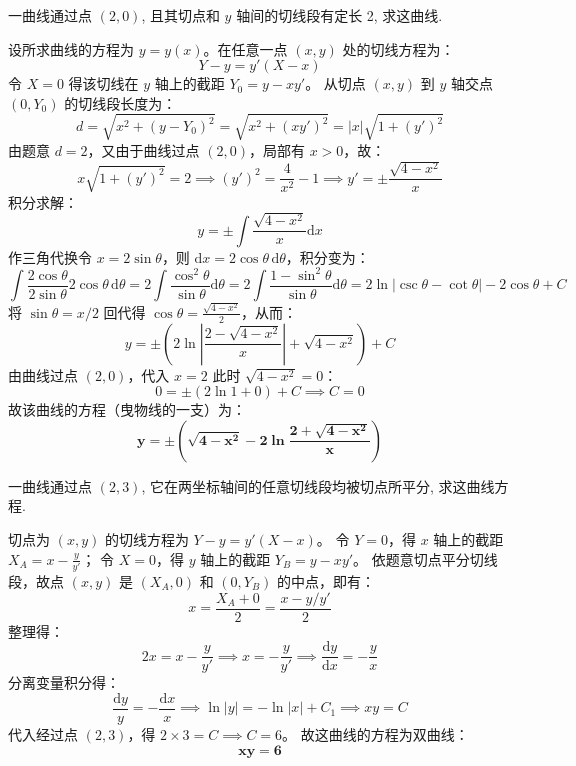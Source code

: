 \documentclass[lang=cn,11pt]{elegantbook}
\begin{document}
\begin{exercise}[求解曲线]
一曲线通过点 $(2,0)$, 且其切点和 $y$ 轴间的切线段有定长 2, 求这曲线.
\end{exercise}
\begin{solution}
设所求曲线的方程为 $y=y(x)$。在任意一点 $(x,y)$ 处的切线方程为：
\[
Y-y = y'(X-x)
\]
令 $X=0$ 得该切线在 $y$ 轴上的截距 $Y_0 = y - xy'$。
从切点 $(x,y)$ 到 $y$ 轴交点 $(0, Y_0)$ 的切线段长度为：
\[
d = \sqrt{x^2 + (y-Y_0)^2} = \sqrt{x^2 + (xy')^2} = |x|\sqrt{1+(y')^2}
\]
由题意 $d=2$，又由于曲线过点 $(2,0)$，局部有 $x>0$，故：
\[
x\sqrt{1+(y')^2} = 2 \implies (y')^2 = \frac{4}{x^2}-1 \implies y' = \pm\frac{\sqrt{4-x^2}}{x}
\]
积分求解：
\[
y = \pm\int \frac{\sqrt{4-x^2}}{x}\mathrm{d}x
\]
作三角代换令 $x = 2\sin\theta$，则 $\mathrm{d}x = 2\cos\theta\,\mathrm{d}\theta$，积分变为：
\[
\int \frac{2\cos\theta}{2\sin\theta} 2\cos\theta\,\mathrm{d}\theta = 2\int \frac{\cos^2\theta}{\sin\theta}\mathrm{d}\theta = 2\int \frac{1-\sin^2\theta}{\sin\theta}\mathrm{d}\theta = 2\ln|\csc\theta - \cot\theta| - 2\cos\theta + C
\]
将 $\sin\theta = x/2$ 回代得 $\cos\theta = \frac{\sqrt{4-x^2}}{2}$，从而：
\[
y = \pm \left( 2\ln\left|\frac{2-\sqrt{4-x^2}}{x}\right| + \sqrt{4-x^2} \right) + C
\]
由曲线过点 $(2,0)$，代入 $x=2$ 此时 $\sqrt{4-x^2}=0$：
\[
0 = \pm (2\ln 1 + 0) + C \implies C=0
\]
故该曲线的方程（曳物线的一支）为：
\[
\mathbf{y = \pm \left( \sqrt{4-x^2} - 2\ln\frac{2+\sqrt{4-x^2}}{x} \right)}
\]
\end{solution}

\begin{exercise}[求解曲线]
一曲线通过点 $(2,3)$, 它在两坐标轴间的任意切线段均被切点所平分, 求这曲线方程.
\end{exercise}
\begin{solution}
切点为 $(x,y)$ 的切线方程为 $Y-y = y'(X-x)$。
令 $Y=0$，得 $x$ 轴上的截距 $X_A = x - \frac{y}{y'}$；
令 $X=0$，得 $y$ 轴上的截距 $Y_B = y - x y'$。
依题意切点平分切线段，故点 $(x,y)$ 是 $(X_A, 0)$ 和 $(0, Y_B)$ 的中点，即有：
\[
x = \frac{X_A + 0}{2} = \frac{x - y/y'}{2}
\]
整理得：
\[
2x = x - \frac{y}{y'} \implies x = -\frac{y}{y'} \implies \frac{\mathrm{d}y}{\mathrm{d}x} = -\frac{y}{x}
\]
分离变量积分得：
\[
\frac{\mathrm{d}y}{y} = -\frac{\mathrm{d}x}{x} \implies \ln|y| = -\ln|x| + C_1 \implies xy = C
\]
代入经过点 $(2,3)$，得 $2 \times 3 = C \implies C=6$。
故这曲线的方程为双曲线：
\[
\mathbf{xy = 6}
\]
\end{solution}
\end{document}
